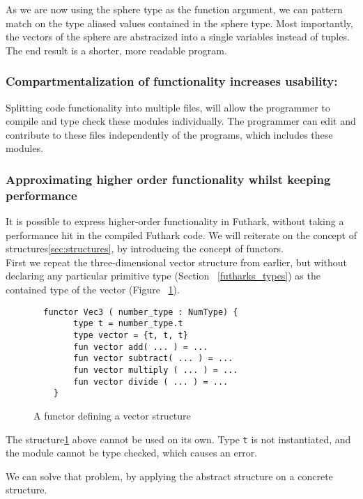\noindent As we are now using the sphere type as the function argument, we can pattern
match on the type aliased values contained in the sphere type.
Most importantly, the vectors of the sphere are abstracized into a single variables
instead of tuples.
\\
The end result is a shorter, more readable program.

\subsubsection{Compartmentalization of functionality increases usability:}
Splitting code functionality into multiple files, will allow the programmer to
compile and type check these modules individually. The programmer can edit and
contribute to these files independently of the programs, which includes these
modules.

\subsubsection{Approximating higher order functionality whilst keeping performance}
\label{subsec:higherorderfunctionality}
It is possible to express higher-order functionality in Futhark, without taking
a performance hit in the compiled Futhark code.
We will reiterate on the concept of structures\ref{sec:structures}, by introducing
the concept of functors.\\
First we repeat the three-dimensional vector structure
from earlier, but without declaring any particular
primitive type (Section ~\ref{futharks_types}) as the contained type of the vector (Figure ~\ref{struct_vec3}).
\begin{figure}
  \begin{verbatim}
  functor Vec3 ( number_type : NumType) { 
        type t = number_type.t
        type vector = {t, t, t}
        fun vector add( ... ) = ...
        fun vector subtract( ... ) = ...
        fun vector multiply ( ... ) = ...
        fun vector divide ( ... ) = ...
    }
  \end{verbatim}
  \caption{A functor defining a vector structure \label{struct_vec3}}
\end{figure}

The structure\ref{struct_vec3} above cannot be used on its own. Type \texttt{t} is not
instantiated, and the module cannot be type checked, which causes an error.


We can solve that problem, by applying the abstract structure on a concrete
structure.

